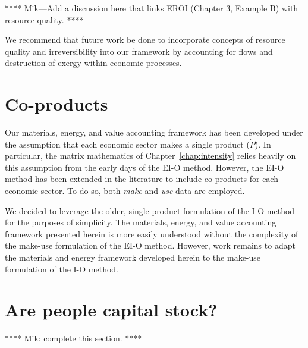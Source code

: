**** Mik---Add a discussion here that links 
EROI (Chapter 3, Example B) with resource quality. ****

\vspace{5 mm}

We recommend that future work be done to incorporate 
concepts of resource quality and irreversibility 
into our framework by accounting for flows and
destruction of exergy within economic processes.


\section{Co-products}
\label{sec:make-use}

Our materials, energy, and value accounting framework 
has been developed under the assumption 
that each economic sector makes a single product ($\dot{P}$).
In particular, the matrix mathematics of Chapter~\ref{chap:intensity}
relies heavily on this assumption 
from the early days of the EI-O method.\cite{Bullard:1978vd}
However, the EI-O method has been extended 
in the literature to include
co-products for each economic sector.\cite{Costanza:1984tq,Casler1984} 
To do so, both \emph{make} and \emph{use} data are employed.

We decided to leverage the older,
single-product formulation of the I-O method
for the purposes of simplicity. 
The materials, energy, and value accounting framework
presented herein is more easily understood 
without the complexity of the make-use formulation 
of the EI-O method.
However, work remains to adapt the materials and energy framework
developed herein to the make-use formulation of the I-O method.


\section{Are people capital stock?}
\label{sec:people_as_stock}

**** Mik: complete this section. ****

